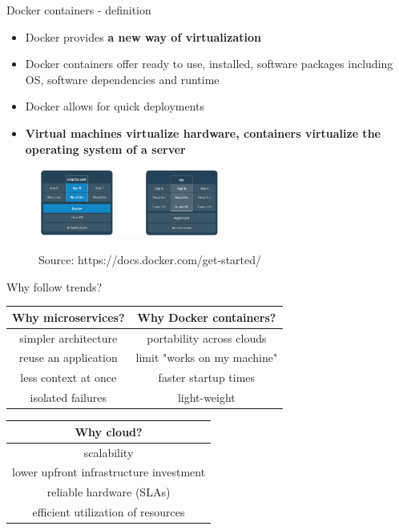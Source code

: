 \documentclass{beamer}
\newcommand{\source}[1]{\caption*{Source: {#1}} }
\begin{document}
\begin{frame}{Docker containers - definition}%
\begin{itemize}
\item Docker provides \textbf{a new way of virtualization}
\item Docker containers offer ready to use, installed, software packages including OS, software dependencies and runtime
\item Docker allows for quick deployments
\item \textbf{Virtual machines virtualize hardware, containers virtualize the operating system of a server}
\end{itemize}
\begin{figure}
	\includegraphics[width=6cm]{figures/docker-vs-vms.png}
	\label{fig:docker-vs-vms}
	\source{https://docs.docker.com/get-started/}
\end{figure}
\end{frame}

\begin{frame}{Why follow trends?}%
\begin{center}
	\begin{tabular}{ | c | c |}
		\hline
		{\bfseries Why microservices?} & {\bfseries Why Docker containers?} \\ \hline
		simpler architecture & portability across clouds \\ \hline
		reuse an application & limit "works on my machine" \\ \hline
		less context at once & faster startup times \\ \hline
		isolated failures &  light-weight \\ \hline
		\hline
	\end{tabular}
	\begin{tabular}{ | c |}
		\hline
		 {\bfseries Why cloud?} \\ \hline
		 scalability \\ \hline
		 lower upfront infrastructure investment \\ \hline
		 reliable hardware (SLAs) \\ \hline
		 efficient utilization of resources \\ \hline
		\hline
	\end{tabular}
\end{center}
\end{frame}
\end{document}
